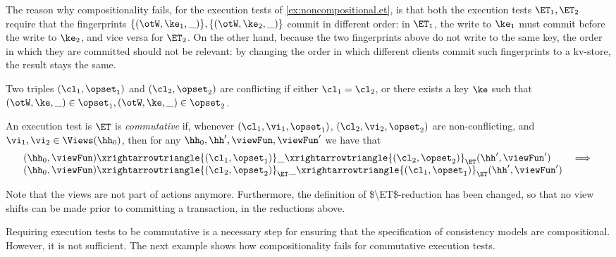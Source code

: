 The reason why compositionality fails, for the execution tests of \cref{ex:noncompositional.et}, 
is that both the execution tests $\ET_1, \ET_2$ require that the fingerprints 
$\{(\otW, \ke_1, \_)\}, \{(\otW, \ke_2, \_)\}$ commit in different order: in $\ET_1$, the write to $\ke_1$ must commit 
before the write to $\ke_2$, and vice versa for $\ET_2$. On the other hand, 
because the two fingerprints above do not write to the same key, 
the order in which they are committed should not be relevant: by changing the order 
in which different clients commit such fingerprints to a kv-store, the result stays the same. 
\begin{definition}
Two triples $(\cl_1, \opset_1)$ and $(\cl_2, \opset_2)$ are 
conflicting if either $\cl_1 = \cl_2$, or there exists a key $\ke$ such that 
$(\otW, \ke, \_) \in \opset_1, (\otW, \ke, \_) \in \opset_2$. 

An execution test is $\ET$ is \emph{commutative} if, whenever $(\cl_1, \vi_1, \opset_1)$, 
$(\cl_2, \vi_2, \opset_2)$ are non-conflicting, and $\vi_1, \vi_2 \in \Views(\hh_0)$,  
then for any $\hh_0, \hh', \viewFun, \viewFun'$ we have that 
\[
\begin{array}{lr}
(\hh_0, \viewFun) \xrightarrowtriangle{(\cl_1, \opset_1)}
\_ \xrightarrowtriangle{(\cl_2, \opset_2)}_{\ET} (\hh', \viewFun') &\implies \\
(\hh_0, \viewFun) \xrightarrowtriangle{(\cl_2, \opset_2)}_{\ET} 
\_ \xrightarrowtriangle{(\cl_1, \opset_1)}_{\ET} (\hh', \viewFun')
\end{array}
\]
\end{definition}
\ac{Note that the views are not part of actions anymore. Furthermore, the definition 
of $\ET$-reduction has been changed, so that no view shifts can be made prior to 
committing a transaction, in the reductions above.}

Requiring execution tests to be commutative is a necessary step for ensuring 
that the specification of consistency models are compositional. However, it 
is not sufficient. The next example shows how compositionality fails 
for commutative execution tests. 

